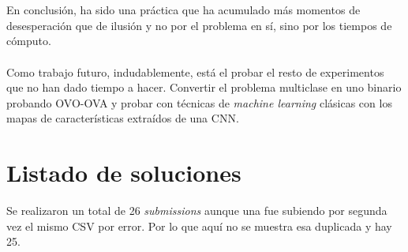 \\ \\
En conclusión, ha sido una práctica que ha acumulado más momentos de desesperación que de ilusión y no por el problema en sí, sino por los tiempos de cómputo.
\\ \\
Como trabajo futuro, indudablemente, está el probar el resto de experimentos que no han dado tiempo a hacer. Convertir el problema multiclase en uno binario probando OVO-OVA y probar con técnicas de \textit{machine learning} clásicas con los mapas de características extraídos de una CNN.

\section{Listado de soluciones}

Se realizaron un total de 26 \textit{submissions} aunque una fue subiendo por segunda vez el mismo CSV por error. Por lo que aquí no se  muestra esa duplicada y hay 25.

